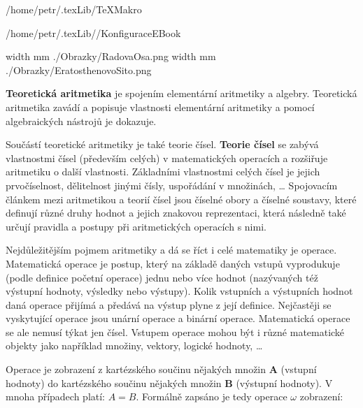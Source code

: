 
\def\addr{/home/petr/.texLib/}

%
%
%

 \addr TeXMakro
\setAddress{\addr}

 \addr/KonfiguraceEBook

\pdfximage width \the\SirkaOdstavce mm {./Obrazky/RadovaOsa.png}
\pdfximage width \the\SirkaOdstavce mm {./Obrazky/EratosthenovoSito.png}




\Obsah

{\bf Teoretická aritmetika} je spojením elementární aritmetiky a algebry. Teoretická aritmetika zavádí a popisuje vlastnosti elementární aritmetiky a pomocí algebraických nástrojů je dokazuje.

Součástí teoretické aritmetiky je také teorie čísel. {\bf Teorie čísel} se zabývá vlastnostmi čísel (především celých) v matematických operacích a rozšiřuje aritmetiku o další vlastnosti. Základními vlastnostmi celých čísel je jejich prvočíselnost, dělitelnost jinými čísly, uspořádání v množinách, …
Spojovacím článkem mezi aritmetikou a teorií čísel jsou číselné obory a číselné soustavy, které definují různé druhy hodnot a jejich znakovou reprezentaci, která následně také určují pravidla a postupy při aritmetických operacích s nimi.


Nejdůležitějším pojmem aritmetiky a dá se říct i celé matematiky je operace. Matematická operace je postup, který na základě daných vstupů vyprodukuje (podle definice početní operace) jednu nebo více hodnot (nazývaných též výstupní hodnoty, výsledky nebo výstupy). Kolik vstupních a výstupních hodnot daná operace přijímá a předává na výstup plyne z její definice. Nejčastěji se vyskytující operace jsou unární operace a binární operace. Matematická operace se ale nemusí týkat jen čísel. Vstupem operace mohou být i různé matematické objekty jako například množiny, vektory, logické hodnoty, …

Operace je zobrazení z kartézského součinu nějakých množin {\bf A} (vstupní hodnoty) do kartézského součinu nějakých množin {\bf B} (výstupní hodnoty). V mnoha případech platí: $A = B$. Formálně zapsáno je tedy operace $ \omega $ zobrazení:


